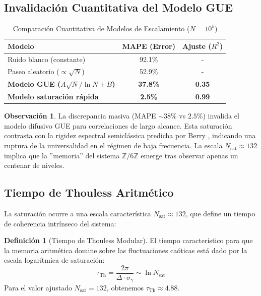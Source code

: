 \documentclass[12pt, a4paper]{article}
\theoremstyle{plain}
\theoremstyle{definition}
\newtheorem{definicion}[teorema]{Definición}
\newtheorem{observacion}[teorema]{Observación}
\newcommand{\Z}{\mathbb{Z}}
\begin{document}
\subsection{Invalidación Cuantitativa del Modelo GUE}

\begin{table}[H]
\centering
\caption{Comparación Cuantitativa de Modelos de Escalamiento ($N=10^5$)}
\label{tab:modelos_snr}
\begin{tabular}{@{}lcc@{}}
\toprule
\textbf{Modelo} & \textbf{MAPE (Error)} & \textbf{Ajuste ($R^2$)} \\
\midrule
Ruido blanco (constante) & 92.1\% & - \\
Paseo aleatorio ($\propto \sqrt{N}$) & 52.9\% & - \\
\textbf{Modelo GUE ($A\sqrt{N}/\ln N + B$)} & \textbf{37.8\%} & \textbf{0.35} \\
\textbf{Modelo saturación rápida} & \textbf{2.5\%} & \textbf{0.99} \\
\bottomrule
\end{tabular}
\end{table}

\begin{observacion}
La discrepancia masiva (MAPE $\sim 38\%$ vs $2.5\%$) invalida el modelo difusivo GUE para correlaciones de largo alcance. Esta saturación contrasta con la rigidez espectral semiclássica predicha por Berry \cite{berry1985}, indicando una ruptura de la universalidad en el régimen de baja frecuencia. La escala $N_{\text{sat}} \approx 132$ implica que la ''memoria'' del sistema $\Z/6\Z$ emerge tras observar apenas un centenar de niveles.
\end{observacion}

\subsection{Tiempo de Thouless Aritmético}

La saturación ocurre a una escala característica $N_{\text{sat}} \approx 132$, que define un tiempo de coherencia intrínseco del sistema:

\begin{definicion}[Tiempo de Thouless Modular]
El tiempo característico para que la memoria aritmética domine sobre las fluctuaciones caóticas está dado por la escala logarítmica de saturación:
\[
\tau_{\text{Th}} = \frac{2\pi}{\Delta \cdot \sigma_{\gamma}} \sim \ln N_{\text{sat}}
\]
Para el valor ajustado $N_{\text{sat}} = 132$, obtenemos $\tau_{\text{Th}} \approx 4.88$.
\end{definicion}
\end{document}
